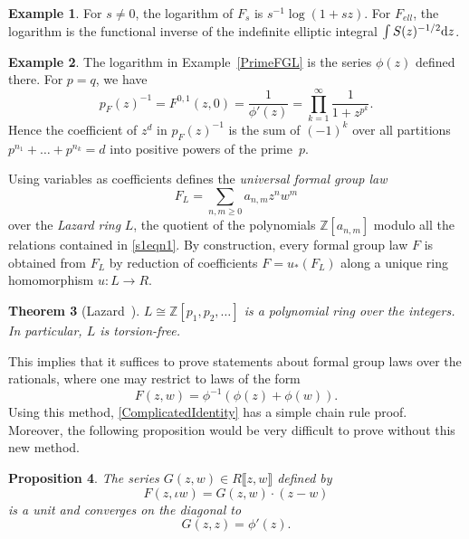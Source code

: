 \documentclass[10pt,a4paper]{amsart}
\numberwithin{equation}{section}
\newtheorem{Theorem}{Theorem}[section]
\newtheorem{Proposition}[Theorem]{Proposition}
\theoremstyle{definition}
\newtheorem{Example}[Theorem]{Example}
\def\lb{\llbracket}
\def\rb{\rrbracket}
\begin{document}
\begin{Example}
For $s\neq0$, the logarithm of $F_s$ is $s^{-1}\log(1+sz)$. For $F_{ell}$, the logarithm is the functional inverse of the indefinite elliptic integral $\int S(z)^{-1/2}{\rm d}z$.
\end{Example}

\begin{Example}
 The logarithm in Example~\ref{PrimeFGL} is the series $\phi(z)$ defined there. For $p=q$, we have
 \[
 p_F(z)^{-1}=F^{0,1}(z,0)=\frac{1}{\phi'(z)}=\prod_{k=1}^\infty\frac{1}{1+z^{p^k}}.
 \]
 Hence the coefficient of $z^d$ in $p_F(z)^{-1}$ is the sum of $(-1)^k$ over all partitions $p^{n_1}+\dots+p^{n_k}=d$ into positive powers of the prime~$p$.
\end{Example}


Using variables as coefficients defines the \emph{universal formal group law}
\[
F_L=\sum_{n,m\geqslant0}a_{n,m}z^nw^m
\]
over the \emph{Lazard ring} $L$, the quotient of the polynomials $\mathbb{Z}[a_{n,m}]$ modulo all the relations contained in \eqref{s1eqn1}. By construction, every formal group law $F$ is obtained from $F_L$ by reduction of coefficients $F=u_*(F_L)$ along a unique ring homomorphism $u\colon L\to R$.

\begin{Theorem}[{Lazard~\cite{Laz}}]
$L\cong\mathbb{Z}[p_1,p_2,\dots]$ is a polynomial ring over the integers. In particular, $L$ is torsion-free.
\end{Theorem}

This implies that it suffices to prove statements about formal group laws over the rationals, where one may restrict to laws of the form
\begin{equation}\label{s1eqn9}
 F(z,w)=\phi^{-1}(\phi(z)+\phi(w)).
\end{equation}
Using this method, \eqref{ComplicatedIdentity} has a simple chain rule proof. Moreover, the following proposition would be very difficult to prove without this new method.

\begin{Proposition}
 The series $G(z,w)\in R\lb z,w\rb$ defined by
\begin{equation}\label{differByUnit}
F(z,\iota w)=G(z,w)\cdot(z-w)
\end{equation}
is a unit and converges on the diagonal to
\begin{equation}
\label{Gdiagonal}
 G(z,z)=\phi'(z).
\end{equation}
\end{Proposition}
\end{document}

